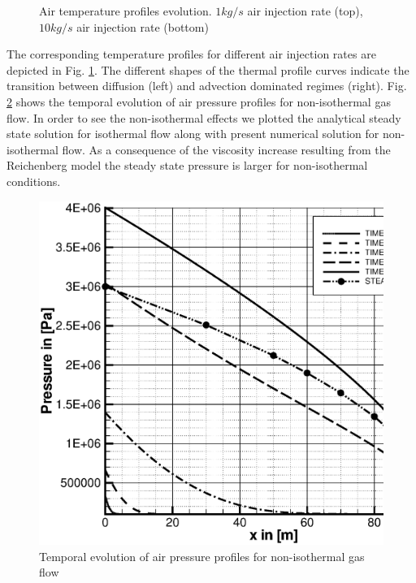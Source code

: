 \begin{figure}[htb!]
\caption{Air temperature profiles evolution. $1 kg/s$ air injection rate (top), $10 kg/s$ air injection rate (bottom)}
\label{fig:air_heat_1d_heat}
\end{figure}

The corresponding temperature profiles for different air injection rates are depicted in Fig. \ref{fig:air_heat_1d_heat}. The different shapes of the thermal profile curves indicate the transition between diffusion (left) and advection dominated regimes (right).
%
Fig. \ref{fig:visco8} shows the temporal evolution of air pressure profiles for non-isothermal gas flow. In order to see the non-isothermal effects we plotted the analytical steady state solution for isothermal flow along with present numerical solution for non-isothermal flow. As a consequence of the viscosity increase resulting from the Reichenberg model the steady state pressure is larger for non-isothermal conditions.

\begin{figure}[htb!]
\begin{center}
\footnotesize
\includegraphics[width=0.85\columnwidth]{H_GAS/figures/non_isothermal_flow.eps}  %
\caption{Temporal evolution of air pressure profiles for non-isothermal gas flow}
\label{fig:visco8}
\end{center}
\end{figure}

